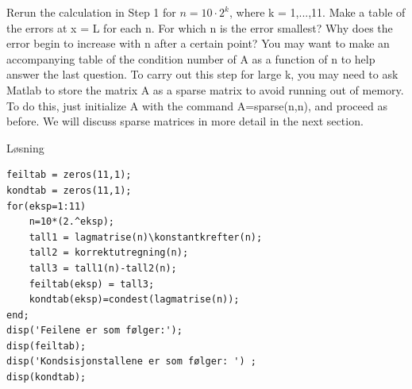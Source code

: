 % 

Rerun the calculation in Step 1 for $n = 10\cdot2^k$, where k = 1,...,11. Make a table of the errors at x = L for each n. For which n is the error smallest? Why does the error begin to increase with n after a certain point? You may want to make an accompanying table of the
condition number of A as a function of n to help answer the last question. To carry out this step for large k, you may need to ask Matlab to store the matrix A as a sparse matrix to avoid running out of memory. To do this, just initialize A with the command A=sparse(n,n), and proceed as before. We will discuss sparse matrices in more detail in the next section.

\vspace{5mm}
Løsning

\begin{lstlisting}[caption={oppgave3.m}]
feiltab = zeros(11,1); 
kondtab = zeros(11,1); 
for(eksp=1:11)
    n=10*(2.^eksp);
    tall1 = lagmatrise(n)\konstantkrefter(n);
    tall2 = korrektutregning(n);
    tall3 = tall1(n)-tall2(n); 
    feiltab(eksp) = tall3; 
    kondtab(eksp)=condest(lagmatrise(n));
end;
disp('Feilene er som følger:'); 
disp(feiltab); 
disp('Kondsisjonstallene er som følger: ') ; 
disp(kondtab); 
\end{lstlisting}

\vspace{3mm}

